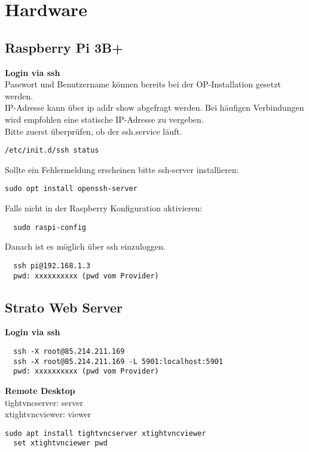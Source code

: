 \newpage
\section{Hardware}

\subsection{Raspberry Pi 3B+}
\textbf{Login via ssh}\\
Passwort und Benutzername können bereits bei der OP-Installation gesetzt werden.\\
IP-Adresse kann über ip addr show abgefragt werden. Bei häufigen Verbindungen wird empfohlen 
eine statische IP-Adresse zu vergeben.\\

Bitte zuerst überprüfen, ob der ssh.service läuft.
\begin{verbatim}
/etc/init.d/ssh status
\end{verbatim}
Sollte ein Fehlermeldung erscheinen bitte ssh-server installieren:\\
\begin{verbatim}
sudo opt install openssh-server
\end{verbatim}
Falls nicht in der Raspberry Konfiguration aktivieren:
\begin{verbatim}
  sudo raspi-config
\end{verbatim}
Danach ist es möglich über ssh einzuloggen.
\begin{verbatim}
  ssh pi@192.168.1.3
  pwd: xxxxxxxxxx (pwd vom Provider)
\end{verbatim}

\subsection{Strato Web Server}
\textbf{Login via ssh}
\begin{verbatim}
  ssh -X root@85.214.211.169
  ssh -X root@85.214.211.169 -L 5901:localhost:5901
  pwd: xxxxxxxxxx (pwd vom Provider)
\end{verbatim}
\textbf{Remote Desktop}\\
tightvncserver: server\\
xtightvncviewer: viewer
\begin{verbatim}sudo apt install tightvncserver xtightvncviewer
  set xtightvnciewer pwd
\end{verbatim}

